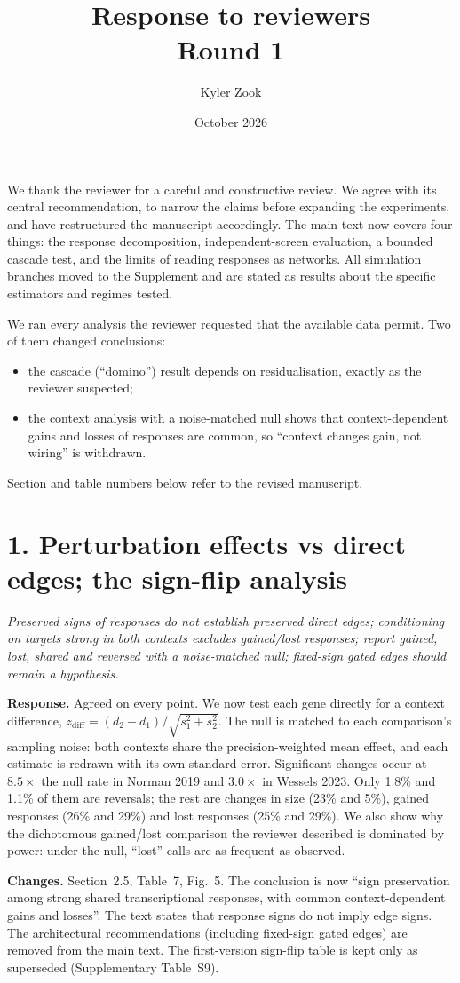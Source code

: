 \documentclass[10pt]{article}
\title{\textbf{Response to reviewers}\\\large Round 1}
\author{Kyler Zook}
\date{October 2026}
\newenvironment{rev}{\par\medskip\noindent\color{black!70}\itshape}{\par}
\newcommand{\resp}{\par\smallskip\noindent\textbf{Response.} }
\newcommand{\chg}{\par\smallskip\noindent\textbf{Changes.} }
\begin{document}
\maketitle

We thank the reviewer for a careful and constructive review. We agree with its central recommendation, to narrow the claims before expanding the experiments, and have restructured the manuscript accordingly.
The main text now covers four things: the response decomposition, independent-screen evaluation, a bounded cascade test, and the limits of reading responses as networks. All simulation branches moved to the Supplement and are stated as results about the specific estimators and regimes tested.

We ran every analysis the reviewer requested that the available data permit. Two of them changed conclusions:
\begin{itemize}
\item the cascade (``domino'') result depends on residualisation, exactly as the reviewer suspected;
\item the context analysis with a noise-matched null shows that context-dependent gains and losses of responses are common, so ``context changes gain, not wiring'' is withdrawn.
\end{itemize}
Section and table numbers below refer to the revised manuscript.

\section*{1. Perturbation effects vs direct edges; the sign-flip analysis}
\begin{rev}Preserved signs of responses do not establish preserved direct edges; conditioning on targets strong in both contexts excludes gained/lost responses; report gained, lost, shared and reversed with a noise-matched null; fixed-sign gated edges should remain a hypothesis.\end{rev}
\resp Agreed on every point. We now test each gene directly for a context difference, $z_\text{diff}=(d_2-d_1)/\sqrt{s_1^2+s_2^2}$. The null is matched to each comparison's sampling noise: both contexts share the precision-weighted mean effect, and each estimate is redrawn with its own standard error.
Significant changes occur at $8.5\times$ the null rate in Norman 2019 and $3.0\times$ in Wessels 2023. Only 1.8\% and 1.1\% of them are reversals; the rest are changes in size (23\% and 5\%), gained responses (26\% and 29\%) and lost responses (25\% and 29\%).
We also show why the dichotomous gained/lost comparison the reviewer described is dominated by power: under the null, ``lost'' calls are as frequent as observed.
\chg Section~2.5, Table~7, Fig.~5. The conclusion is now ``sign preservation among strong shared transcriptional responses, with common context-dependent gains and losses''. The text states that response signs do not imply edge signs. The architectural recommendations (including fixed-sign gated edges) are removed from the main text. The first-version sign-flip table is kept only as superseded (Supplementary Table~S9).
\end{document}
